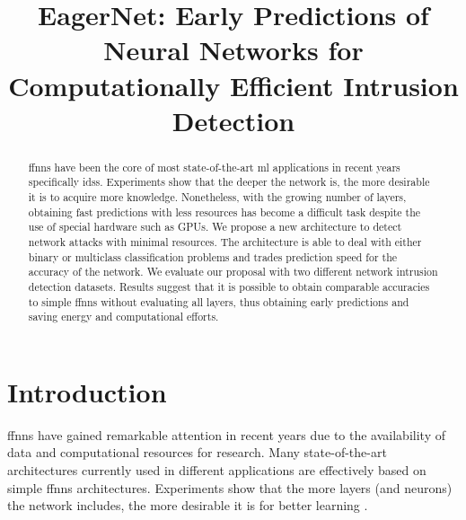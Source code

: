 \documentclass[conference]{IEEEtran}
\begin{document}
\title{EagerNet: Early Predictions of Neural Networks for Computationally Efficient Intrusion Detection}

\author{
}



\maketitle

\begin{abstract}

\glspl{ffnn} have been the core of most state-of-the-art \gls{ml} applications in recent years specifically \glspl{ids}. Experiments show that the deeper the network is, the more desirable it is to acquire more knowledge. Nonetheless, with the growing number of layers, obtaining fast predictions with less resources has become a difficult task despite the use of special hardware such as GPUs. We propose a new architecture to detect network attacks with minimal resources. The architecture is able to deal with either binary or multiclass classification problems and trades prediction speed for the accuracy of the network. We evaluate our proposal with two different network intrusion detection datasets. Results suggest that it is possible to obtain comparable accuracies to simple \glspl{ffnn} without evaluating all layers, thus obtaining early predictions and saving energy and computational efforts.

\end{abstract}

\begin{IEEEkeywords}

\end{IEEEkeywords}

\section{Introduction}
\glspl{ffnn} have gained remarkable attention in recent years due to the availability of data and computational resources for research. Many state-of-the-art architectures currently used in different applications are effectively based on simple \glspl{ffnn} architectures. Experiments show that the more layers (and neurons) the network includes, the more desirable it is for better learning \cite{eldan_power_2016} .
\end{document}
